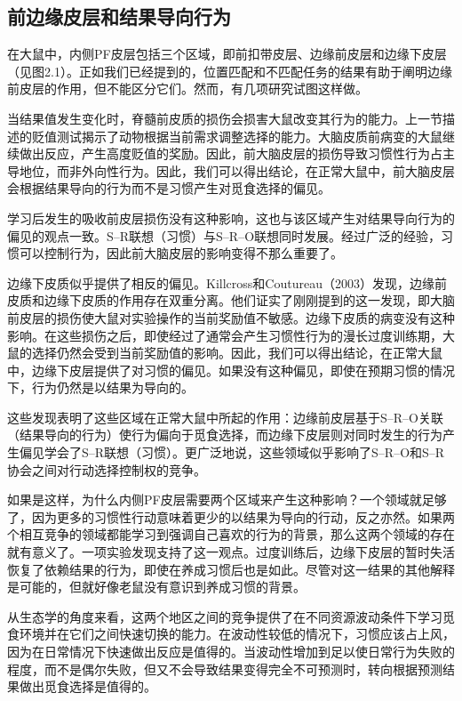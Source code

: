 \subsection{前边缘皮层和结果导向行为}
在大鼠中，内侧PF皮层包括三个区域，即前扣带皮层、边缘前皮层和边缘下皮层（见图2.1）。正如我们已经提到的，位置匹配和不匹配任务的结果有助于阐明边缘前皮层的作用，但不能区分它们。然而，有几项研究试图这样做。\par
当结果值发生变化时，脊髓前皮质的损伤会损害大鼠改变其行为的能力。上一节描述的贬值测试揭示了动物根据当前需求调整选择的能力。大脑皮质前病变的大鼠继续做出反应，产生高度贬值的奖励。因此，前大脑皮层的损伤导致习惯性行为占主导地位，而非外向性行为\cite{Balleine&Dickinson 1998;Corbit&Balleine 2003}。因此，我们可以得出结论，在正常大鼠中，前大脑皮层会根据结果导向的行为而不是习惯产生对觅食选择的偏见。\par
学习后发生的吸收前皮层损伤没有这种影响\cite{Ostlund&Balleine 2005}，这也与该区域产生对结果导向行为的偏见的观点一致。S–R联想（习惯）与S–R–O联想同时发展。经过广泛的经验，习惯可以控制行为，因此前大脑皮层的影响变得不那么重要了。\par
边缘下皮质似乎提供了相反的偏见。Killcross和Coutureau（2003）发现，边缘前皮质和边缘下皮质的作用存在双重分离。他们证实了刚刚提到的这一发现，即大脑前皮层的损伤使大鼠对实验操作的当前奖励值不敏感。边缘下皮质的病变没有这种影响。在这些损伤之后，即使经过了通常会产生习惯性行为的漫长过度训练期，大鼠的选择仍然会受到当前奖励值的影响。因此，我们可以得出结论，在正常大鼠中，边缘下皮层提供了对习惯的偏见。如果没有这种偏见，即使在预期习惯的情况下，行为仍然是以结果为导向的。\par
这些发现表明了这些区域在正常大鼠中所起的作用：边缘前皮层基于S–R–O关联（结果导向的行为）使行为偏向于觅食选择，而边缘下皮层则对同时发生的行为产生偏见学会了S–R联想（习惯）。更广泛地说，这些领域似乎影响了S–R–O和S–R协会之间对行动选择控制权的竞争。\par
如果是这样，为什么内侧PF皮层需要两个区域来产生这种影响？一个领域就足够了，因为更多的习惯性行动意味着更少的以结果为导向的行动，反之亦然。如果两个相互竞争的领域都能学习到强调自己喜欢的行为的背景，那么这两个领域的存在就有意义了。一项实验发现支持了这一观点。过度训练后，边缘下皮层的暂时失活恢复了依赖结果的行为，即使在养成习惯后也是如此\cite{Coutureau&Killcross,2003}。尽管对这一结果的其他解释是可能的，但就好像老鼠没有意识到养成习惯的背景。\par
从生态学的角度来看，这两个地区之间的竞争提供了在不同资源波动条件下学习觅食环境并在它们之间快速切换的能力。在波动性较低的情况下，习惯应该占上风，因为在日常情况下快速做出反应是值得的。当波动性增加到足以使日常行为失败的程度，而不是偶尔失败，但又不会导致结果变得完全不可预测时，转向根据预测结果做出觅食选择是值得的。\par
